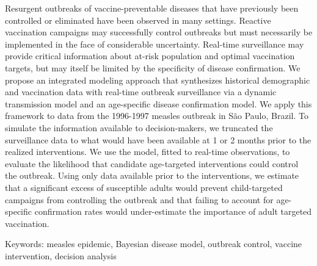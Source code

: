 Resurgent outbreaks of vaccine-preventable diseases that have previously been controlled or eliminated have been observed in many settings. Reactive vaccination campaigns may successfully control outbreaks but must necessarily be implemented in the face of considerable uncertainty.  Real-time surveillance may provide critical information about at-risk population and optimal vaccination targets, but may itself be limited by the specificity of disease confirmation. We propose an integrated modeling approach that synthesizes historical demographic and vaccination data with real-time outbreak surveillance via a dynamic transmission model and an age-specific disease confirmation model. We apply this framework to data from the 1996-1997 measles outbreak in São Paulo, Brazil. To simulate the information available to decision-makers, we truncated the surveillance data to what would have been available at 1 or 2 months prior to the realized interventions. We use the model, fitted to real-time observations, to evaluate the likelihood that candidate age-targeted interventions could control the outbreak. Using only data available prior to the interventions, we estimate that a significant excess of susceptible adults would prevent child-targeted campaigns from controlling the outbreak and that failing to account for age-specific confirmation rates would under-estimate the importance of adult targeted vaccination.

Keywords: measles epidemic, Bayesian disease model, outbreak control, vaccine intervention, decision analysis
